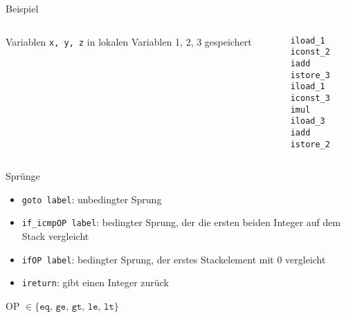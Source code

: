 \documentclass{beamer}
\begin{document}
\begin{frame}{Beispiel}
    \begin{columns}
        \begin{column}{0.55 \textwidth}
            \hspace{1cm}
            
            Variablen \texttt{x, y, z} in lokalen Variablen 1, 2, 3 gespeichert
        \end{column}
        
        \begin{column}{0.3 \textwidth}
        \pause
        \texttt{iload\_1\\iconst\_2\\iadd\\istore\_3\\iload\_1\\iconst\_3\\imul\\iload\_3\\iadd\\istore\_2}
        \end{column}
    \end{columns}
\end{frame}

\begin{frame}{Sprünge}
    \begin{itemize}
        \item \texttt{goto label}: unbedingter Sprung
        \item \texttt{if\_icmpOP label}: bedingter Sprung, der die ersten beiden Integer auf dem Stack vergleicht 
        \item \texttt{ifOP label}: bedingter Sprung, der erstes Stackelement mit 0 vergleicht
        \item \texttt{ireturn}: gibt einen Integer zurück
    \end{itemize}
    OP $\in \{\texttt{eq, ge, gt, le, lt}\}$
\end{frame}
\end{document}
